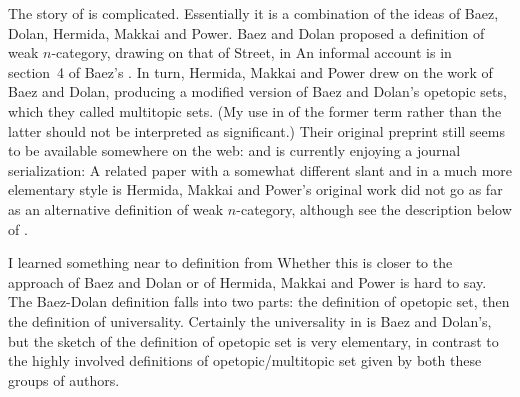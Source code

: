 The story of  is complicated.  Essentially it is a combination of the
ideas of Baez, Dolan, Hermida, Makkai and Power.  Baez and Dolan proposed a
definition of weak $n$-category, drawing on that of Street, in
%
% 
%
% 
An informal account is in section~4 of Baez's .  In turn,
Hermida, Makkai and Power drew on the work of Baez and Dolan, producing a
modified version of Baez and Dolan's opetopic sets, which they called
multitopic sets.  (My use in  of the former term rather than the
latter should not be interpreted as significant.)  Their original preprint
still seems to be available somewhere on the web:
% 
%
% 
and is currently enjoying a journal serialization:
% 
%
% 
% 
%
% 
% 
%
% 
A related paper with a somewhat different slant and in a much more elementary
style is 
% 
%
% 
Hermida, Makkai and Power's original work did not go as far as an alternative
definition of weak $n$-category, although see the description below of
.

I learned something near to definition  from
% 
%
% 
Whether this is closer to the approach of Baez and Dolan or of Hermida,
Makkai and Power is hard to say.  The Baez-Dolan definition falls into two
parts: the definition of opetopic set, then the definition of universality.
Certainly the universality in  is Baez and Dolan's, but the sketch of
the definition of opetopic set is very elementary, in contrast to the highly
involved definitions of opetopic/multitopic set given by both these groups of
authors.

